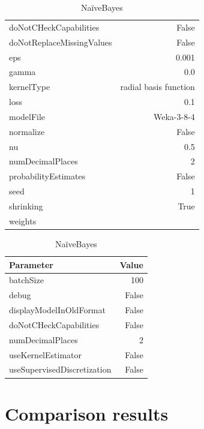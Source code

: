 \begin{table}[H]
\begin{subtable}[t]{.37\linewidth}
\begin{tabular}{lr}
            doNotCHeckCapabilities & False \\
            doNotReplaceMissingValues & False \\
            eps & 0.001 \\
            gamma & 0.0 \\
            kernelType & radial basis function\\
            loss & 0.1 \\
            modelFile & Weka-3-8-4 \\
            normalize & False \\
            nu & 0.5 \\
            numDecimalPlaces & 2 \\
            probabilityEstimates & False \\
            seed & 1 \\
            shrinking & True \\
            weights & \\\bottomrule
        \end{tabular}
    \end{subtable}%
    \begin{subtable}[t]{0.385\linewidth}
        \caption{NaïveBayes \cite{noauthor_naivebayes_nodate}}
        \centering
        \begin{tabular}{lr}\toprule
            Parameter & Value \\\midrule
            batchSize & 100 \\
            debug & False \\
            displayModelInOldFormat & False \\
            doNotCHeckCapabilities & False \\
            numDecimalPlaces & 2 \\
            useKernelEstimator & False \\
            useSupervisedDiscretization & False\\\bottomrule
        \end{tabular}
    \end{subtable}%
\end{table}

\section{Comparison results}


